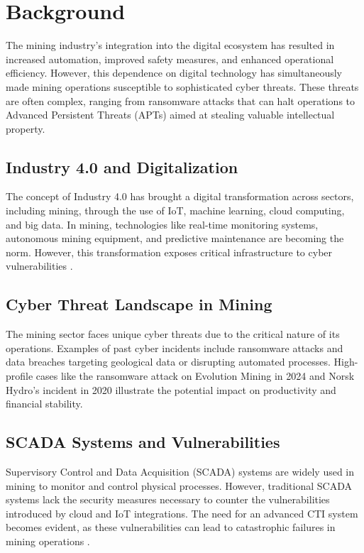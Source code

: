 \documentclass[a4paper,twoside,12pt]{report}
\begin{document}
\section{Background}
The mining industry's integration into the digital ecosystem has resulted in increased automation, improved safety measures, and enhanced operational efficiency. However, this dependence on digital technology has simultaneously made mining operations susceptible to sophisticated cyber threats. These threats are often complex, ranging from ransomware attacks that can halt operations to Advanced Persistent Threats (APTs) aimed at stealing valuable intellectual property.

\subsection*{Industry 4.0 and Digitalization}
The concept of Industry 4.0 has brought a digital transformation across sectors, including mining, through the use of IoT, machine learning, cloud computing, and big data. In mining, technologies like real-time monitoring systems, autonomous mining equipment, and predictive maintenance are becoming the norm. However, this transformation exposes critical infrastructure to cyber vulnerabilities \citep{wang2013cyber, sajid2016cloud}.

\subsection*{Cyber Threat Landscape in Mining}
The mining sector faces unique cyber threats due to the critical nature of its operations. Examples of past cyber incidents include ransomware attacks and data breaches targeting geological data or disrupting automated processes. High-profile cases like the ransomware attack on Evolution Mining in 2024 and Norsk Hydro's incident in 2020 illustrate the potential impact on productivity and financial stability.

\subsection*{SCADA Systems and Vulnerabilities}
Supervisory Control and Data Acquisition (SCADA) systems are widely used in mining to monitor and control physical processes. However, traditional SCADA systems lack the security measures necessary to counter the vulnerabilities introduced by cloud and IoT integrations. The need for an advanced CTI system becomes evident, as these vulnerabilities can lead to catastrophic failures in mining operations \citep{wang2013cyber}.
\end{document}
